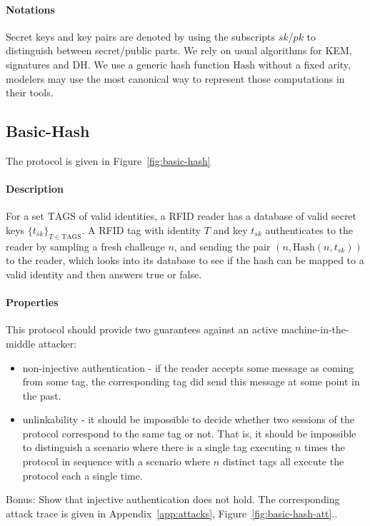 \documentclass{article}
\newcommand{\sfsk}{\mathit{sk}}
\newcommand{\sfpk}{\mathit{pk}}
\newcommand{\kwf}[1]{\mathrm{#1}}
\newcommand{\hash}{\kwf{Hash}}
\newcommand{\tagset}{\kwf{TAGS}}
\begin{document}
\paragraph{Notations} Secret keys and key pairs are denoted by using the subscripts $\sfsk$/$\sfpk$ to distinguish between secret/public parts. We rely on usual algorithms for KEM, signatures and DH. We use a generic hash function $\hash$ without a fixed arity, modelers may use the most canonical way to represent those computations in their tools.

\subsection{Basic-Hash}\label{prob:basic-hash}

The protocol is given in Figure~\ref{fig:basic-hash}

\paragraph{Description} For a set $\tagset$ of valid identities, a RFID reader has a database of valid secret keys $\{t_\sfsk\}_{T \in \tagset}$. A RFID tag with identity $T$ and key $t_\sfsk$ authenticates to the reader by sampling a fresh challenge $n$, and sending the pair $(n,\hash(n,t_\sfsk))$ to the reader, which looks into its database to see if the hash can be mapped to a valid identity and then answers true or false.


\paragraph{Properties} This protocol should provide two guarantees against an active machine-in-the-middle attacker:
\begin{itemize}
\item non-injective authentication - if the reader accepts some message as coming from some tag, the corresponding tag did send this message at some point in the past.
\item unlinkability - it should be impossible to decide whether two sessions of the protocol correspond to the same tag or not. That is, it should be impossible to distinguish a scenario where there is a single tag executing $n$ times the protocol in sequence with a scenario where $n$ distinct tags all execute the protocol each a single time. 
\end{itemize}


Bonus: Show that injective authentication does not hold. The corresponding attack trace is given in Appendix~\ref{app:attacks}, Figure~\ref{fig:basic-hash-att}..
\end{document}
